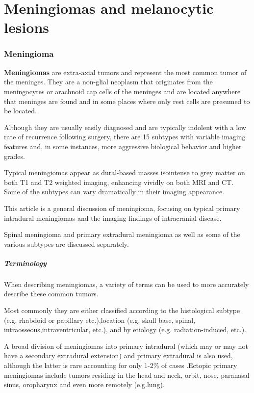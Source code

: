 \chapter{Meningiomas and melanocytic lesions}

\subsection{Meningioma}

\textbf{Meningiomas} are extra-axial tumors and represent the most common tumor of the meninges. They are a non-glial neoplasm that originates from the meningocytes or arachnoid cap cells of the meninges and are located anywhere that meninges are found and in some places where only rest cells are presumed to be located.

Although they are usually easily diagnosed and are typically indolent with a low rate of recurrence following surgery, there are 15 subtypes with variable imaging features and, in some instances, more aggressive biological behavior and higher grades.

Typical meningiomas appear as dural-based masses isointense to grey matter on both T1 and T2 weighted imaging, enhancing vividly on both MRI and CT. Some of the subtypes can vary dramatically in their imaging appearance.

This article is a general discussion of meningioma, focusing on typical primary intradural meningiomas and the imaging findings of intracranial disease.

Spinal meningioma and primary extradural meningioma as well as some of the various subtypes are discussed separately.

\paragraph{Terminology}

When describing meningiomas, a variety of terms can be used to more accurately describe these common tumors.

Most commonly they are either classified according to the histological subtype (e.g. rhabdoid or papillary etc.),location (e.g. skull base, spinal, intraosseous,intraventricular, etc.), and by etiology (e.g. radiation-induced, etc.).

A broad division of meningiomas into primary intradural (which may or may not have a secondary extradural extension) and primary extradural is also used, although the latter is rare accounting for only 1-2\% of cases .Ectopic primary meningiomas include tumors residing in the head and neck, orbit, nose, paranasal sinus, oropharynx and even more remotely (e.g.lung).

